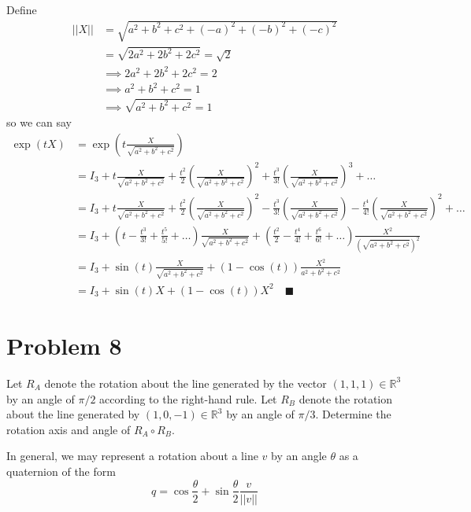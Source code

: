 \documentclass[12pt]{article}
\newcommand{\R}{\mathbb{R}}
\newcommand{\norm}[1]{\left\vert \left\vert #1 \right\vert \right\vert}
\newcommand{\qed}{\quad \blacksquare}
\begin{document}
        Define 
        \begin{align*}
            \norm{X} &= \sqrt{a^{2} + b^{2} + c^{2} + (-a)^2 + (-b)^2 + (-c)^2}\\ 
            & = \sqrt{2a^2 + 2b^2 + 2c^2} = \sqrt{2}\\ 
            &\implies 2a^2 + 2b^2 + 2c^2 = 2\\ 
            &\implies a^2 + b^2 + c^2 = 1\\ 
            &\implies \sqrt{a^2 + b^2 + c^2} = 1
        \end{align*}
        so we can say 
        \begin{align*}
            \exp(tX) &= \exp(t\frac{X}{\sqrt{a^2 + b^2 + c^2}})\\ 
                &= I_3 + t \frac{X}{\sqrt{a^2 + b^2 + c^2}} + \frac{t^2}{2} \left(\frac{X}{\sqrt{a^2 + b^2 + c^2}}\right)^2 + \frac{t^3}{3!} \left(\frac{X}{\sqrt{a^2 + b^2 + c^2}}\right)^3 + \dots\\ 
                &= I_3 + t \frac{X}{\sqrt{a^2 + b^2 + c^2}} + \frac{t^2}{2} \left(\frac{X}{\sqrt{a^2 + b^2 + c^2}}\right)^2 -\frac{t^3}{3!} \left(\frac{X}{\sqrt{a^2 + b^2 + c^2}}\right) - \frac{t^4}{4!} \left(\frac{X}{\sqrt{a^2 + b^2 + c^2}}\right)^2 + \dots\\ 
                &= I_3 + \left(t - \frac{t^3}{3!} + \frac{t^5}{5!} + \dots\right) \frac{X}{\sqrt{a^2 + b^2 + c^2}} + \left(\frac{t^2}{2} - \frac{t^4}{4!} + \frac{t^6}{6!} + \dots\right) \frac{X^2}{(\sqrt{a^2 + b^2 + c^2})^2}\\ 
                &= I_3 + \sin(t) \frac{X}{\sqrt{a^2 + b^2 + c^2}} + \left(1 - \cos(t)\right) \frac{X^2}{a^2 + b^2 + c^2}\\ 
                &= I_3 + \sin(t) X + (1 - \cos(t))X^2 \qed
        \end{align*}
    \color{black}


\pagebreak
\section*{Problem 8} Let $R_{A}$ denote the rotation about the line generated by the vector $(1,1,1) \in \R^{3}$ by an angle of $\pi/2$ according to the right-hand rule.  Let $R_{B}$ denote the rotation about the line generated by $(1,0,-1) \in \R^{3}$ by an angle of $\pi/3$. Determine the rotation axis and angle of $R_{A}\circ R_{B}$.

    \color{blue}
        In general, we may represent a rotation about a line $v$ by an angle $\theta$ as a quaternion of the form 
        \[q = \cos \frac{\theta}{2} + \sin \frac{\theta}{2} \frac{v}{\norm v}\]
\end{document}
